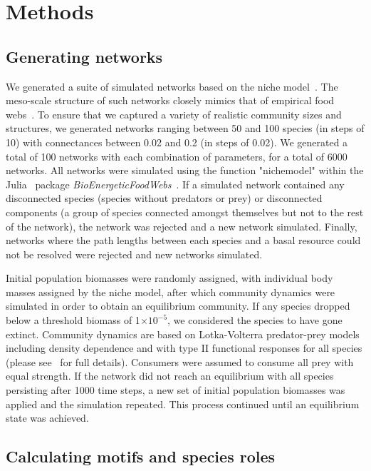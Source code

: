 \documentclass[12pt]{article}
\begin{document}
\section{Methods}

	\subsection*{Generating networks}

		We generated a suite of simulated networks based on the niche model~\citep{Williams2000}. The meso-scale structure of such networks closely mimics that of empirical food webs~\citep{Stouffer2007}. To ensure that we captured a variety of realistic community sizes and structures, we generated networks ranging between 50 and 100 species (in steps of 10) with connectances between 0.02 and 0.2 (in steps of 0.02). We generated a total of 100 networks with each combination of parameters, for a total of 6000 networks. All networks were simulated using the function "nichemodel" within the Julia~\citep{Julia} package \emph{BioEnergeticFoodWebs}~\citep{bioenergfw}. If a simulated network contained any disconnected species (species without predators or prey) or disconnected components (a group of species connected amongst themselves but not to the rest of the network), the network was rejected and a new network simulated. Finally, networks where the path lengths between each species and a basal resource could not be resolved were rejected and new networks simulated.


		Initial population biomasses were randomly assigned, with individual body masses assigned by the niche model, after which community dynamics were simulated in order to obtain an equilibrium community. If any species dropped below a threshold biomass of 1$\times10^{-5}$, we considered the species to have gone extinct. Community dynamics are based on Lotka-Volterra predator-prey models including density dependence and with type II functional responses for all species (please see~\citet{Delmas2017} for full details). Consumers were assumed to consume all prey with equal strength. If the network did not reach an equilibrium with all species persisting after 1000 time steps, a new set of initial population biomasses was applied and the simulation repeated. This process continued until an equilibrium state was achieved.


	\subsection*{Calculating motifs and species roles}
\end{document}
